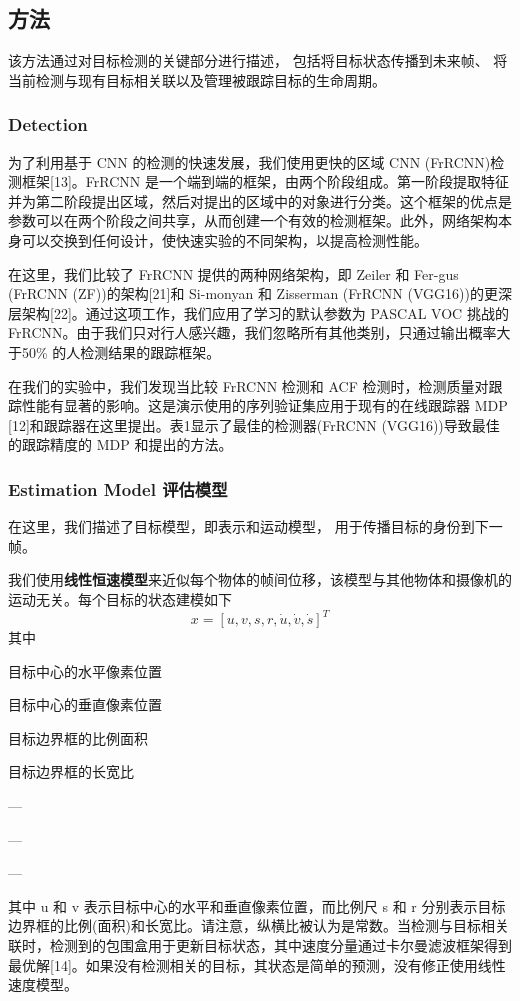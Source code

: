 \documentclass{article}
\begin{document}
\subsection{方法}
该方法通过对目标检测的关键部分进行描述，
包括将目标状态传播到未来帧、
将当前检测与现有目标相关联以及管理被跟踪目标的生命周期。

\subsubsection{Detection}
为了利用基于 CNN 的检测的快速发展，我们使用更快的区域 CNN (FrRCNN)检测框架[13]。FrRCNN 是一个端到端的框架，由两个阶段组成。第一阶段提取特征并为第二阶段提出区域，然后对提出的区域中的对象进行分类。这个框架的优点是参数可以在两个阶段之间共享，从而创建一个有效的检测框架。此外，网络架构本身可以交换到任何设计，使快速实验的不同架构，以提高检测性能。

在这里，我们比较了 FrRCNN 提供的两种网络架构，即 Zeiler 和 Fer-gus (FrRCNN (ZF))的架构[21]和 Si-monyan 和 Zisserman (FrRCNN (VGG16))的更深层架构[22]。通过这项工作，我们应用了学习的默认参数为 PASCAL VOC 挑战的 FrRCNN。由于我们只对行人感兴趣，我们忽略所有其他类别，只通过输出概率大于50\% 的人检测结果的跟踪框架。

在我们的实验中，我们发现当比较 FrRCNN 检测和 ACF 检测时，检测质量对跟踪性能有显著的影响。这是演示使用的序列验证集应用于现有的在线跟踪器 MDP [12]和跟踪器在这里提出。表1显示了最佳的检测器(FrRCNN (VGG16))导致最佳的跟踪精度的 MDP 和提出的方法。

\subsubsection{Estimation Model 评估模型}
在这里，我们描述了目标模型，即表示和运动模型，
用于传播目标的身份到下一帧。

我们使用\textbf{线性恒速模型}来近似每个物体的帧间位移，该模型与其他物体和摄像机的运动无关。每个目标的状态建模如下
\begin{equation}
    x= \left[ u,v,s,r, \dot{u}, \dot{v}, \dot{s}\right] ^{T} \tag{1.1}
\end{equation}
其中
\begin{description}[leftmargin=1.7cm,style=nextline,nosep]%
    \item[$u$] 目标中心的水平像素位置
    \item[$v$] 目标中心的垂直像素位置
    \item[$s$] 目标边界框的比例面积
    \item[$r$] 目标边界框的长宽比
    \item[$\dot{u} $] ---
    \item[$\dot{v} $] ---
    \item[$\dot{s} $]  --- 
\end{description}
其中 u 和 v 表示目标中心的水平和垂直像素位置，而比例尺 s 和 r 分别表示目标边界框的比例(面积)和长宽比。请注意，纵横比被认为是常数。当检测与目标相关联时，检测到的包围盒用于更新目标状态，其中速度分量通过卡尔曼滤波框架得到最优解[14]。如果没有检测相关的目标，其状态是简单的预测，没有修正使用线性速度模型。
\end{document}
